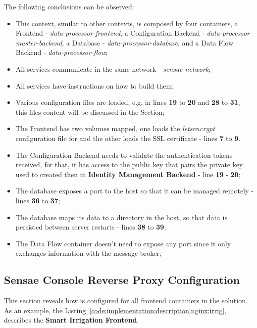 The following conclusions can be observed:

\begin{itemize}
    \item This context, similar to other contexts, is composed by four containers, a Frontend - \textit{data-processor-frontend}, a Configuration Backend - \textit{data-processor-master-backend}, a Database - \textit{data-processor-database}, and a Data Flow Backend - \textit{data-processor-flow};
    \item All services communicate in the same network - \textit{sensae-network};
    \item All services have instructions on how to build them;
    \item Various configuration files are loaded, e.g. in lines \textbf{19} to \textbf{20} and \textbf{28} to \textbf{31}, this files content will be discussed in the  Section;
    \item The Frontend has two volumes mapped, one loads the \textit{letsencrypt} configuration file for  and the other loads the SSL certificate - lines \textbf{7} to \textbf{9}.
    \item The Configuration Backend needs to validate the authentication tokens received, for that, it has access to the public key that pairs the private key used to created then in \textbf{Identity Management Backend} - line \textbf{19} - \textbf{20};
    \item The database exposes a port to the host so that it can be managed remotely - lines \textbf{36} to \textbf{37};
    \item The database maps its data to a directory in the host, so that data is persisted between server restarts - lines \textbf{38} to \textbf{39};
    \item The Data Flow container doesn't need to expose any port since it only exchanges information with the message broker;
\end{itemize}

\subsection{Sensae Console Reverse Proxy Configuration}
\label{subsec:implementation:description:nginx}

This section reveals how  is configured for all frontend containers in the solution. As an example, the Listing~\ref{code:implementation:description:nginx:irrig}, describes the \textbf{Smart Irrigation Frontend}.

